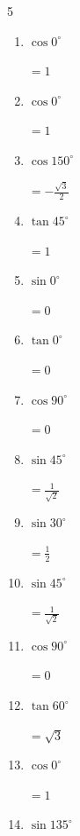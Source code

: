 \begin{multicols}{5}
\begin{enumerate}
\columnbreak %

  \item $\displaystyle \cos{0^\circ}$

        $\displaystyle =1$

  \item $\displaystyle \cos{0^\circ}$

        $\displaystyle =1$

  \item $\displaystyle \cos{150^\circ}$

        $\displaystyle =-\frac{\sqrt{3}}{2}$

  \item $\displaystyle \tan{45^\circ}$

        $\displaystyle =1$

  \item $\displaystyle \sin{0^\circ}$

        $\displaystyle =0$

  \item $\displaystyle \tan{0^\circ}$

        $\displaystyle =0$

  \item $\displaystyle \cos{90^\circ}$

        $\displaystyle =0$

  \item $\displaystyle \sin{45^\circ}$

        $\displaystyle =\frac{1}{\sqrt{2}}$

  \item $\displaystyle \sin{30^\circ}$

        $\displaystyle =\frac{1}{2}$

  \item $\displaystyle \sin{45^\circ}$

        $\displaystyle =\frac{1}{\sqrt{2}}$

  \item $\displaystyle \cos{90^\circ}$

        $\displaystyle =0$

  \item $\displaystyle \tan{60^\circ}$

        $\displaystyle =\sqrt{3}$

  \item $\displaystyle \cos{0^\circ}$

        $\displaystyle =1$

  \item $\displaystyle \sin{135^\circ}$


\end{enumerate}
\end{multicols}
